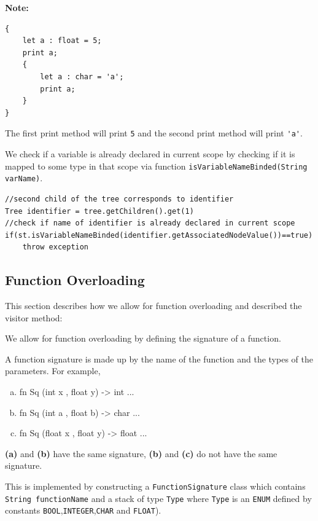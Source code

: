 \textbf{Note:}
\begin{lstlisting}[caption=The same variable name can be used in different scopes]
{
    let a : float = 5;
    print a;
    {
        let a : char = 'a'; 
        print a;
    }
}
\end{lstlisting}
The first print method will print \verb!5! and the second print method will print \verb!'a'!.




We check if a variable is already declared in current scope by checking if it is mapped to some type in that scope via function \verb!isVariableNameBinded(String varName)!. 

\begin{lstlisting}[caption=PSUEDOCODE : checking if a variable is already declared in currentScope (in method visitVariableDeclarationNode(Tree tree)) ]
//second child of the tree corresponds to identifier
Tree identifier = tree.getChildren().get(1)
//check if name of identifier is already declared in current scope
if(st.isVariableNameBinded(identifier.getAssociatedNodeValue())==true)
    throw exception
\end{lstlisting}

\subsection{Function Overloading}

This section describes how we allow for function overloading and described the visitor method: 



We allow for function overloading by defining the signature of a function.

A function signature is made up by the name of the function and the types of the parameters. For example,
\begin{enumerate}[(a)]
\item fn Sq (int x , float y) -> int  {...}
\item  fn Sq (int a , float b) -> char {...}
\item fn Sq (float x , float y) -> float {...}
\end{enumerate}

\textbf{(a)} and \textbf{(b)} have the same signature, \textbf{(b)} and \textbf{(c)} do not have the same signature.

This is implemented by constructing a \verb!FunctionSignature! class which contains \verb!String functionName! and a stack of type \verb!Type! where \verb!Type! is an \verb!ENUM! defined by constants \verb!BOOL!,\verb!INTEGER!,\verb!CHAR! and \verb!FLOAT!).


